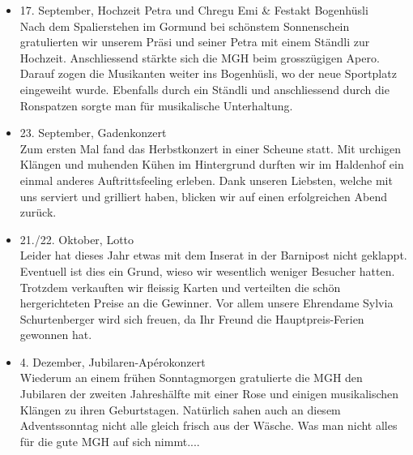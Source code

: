 \begin{history}
\begin{itemize}
        \item[]17. September, Hochzeit Petra und Chregu Emi \& Festakt
        Bogenhüsli\\
        Nach dem Spalierstehen im Gormund bei schönstem Sonnenschein
        gratulierten wir unserem Präsi und seiner Petra mit einem Ständli zur
        Hochzeit. Anschliessend stärkte sich die MGH beim grosszügigen Apero.
        Darauf zogen die Musikanten weiter ins Bogenhüsli, wo der neue
        Sportplatz eingeweiht wurde. Ebenfalls durch ein Ständli und
        anschliessend durch die Ronspatzen sorgte man für musikalische
        Unterhaltung.

        \item[]23. September, Gadenkonzert\\
        Zum ersten Mal fand das Herbstkonzert in einer Scheune statt. Mit
        urchigen Klängen und muhenden Kühen im Hintergrund durften wir im
        Haldenhof ein einmal anderes Auftrittsfeeling erleben. Dank unseren
        Liebsten, welche mit uns serviert und grilliert haben, blicken wir auf
        einen erfolgreichen Abend zurück.

        \item[]21./22. Oktober, Lotto\\
        Leider hat dieses Jahr etwas mit dem Inserat in der Barnipost nicht
        geklappt. Eventuell ist dies ein Grund, wieso wir wesentlich weniger
        Besucher hatten. Trotzdem verkauften wir fleissig Karten und verteilten
        die schön hergerichteten Preise an die Gewinner. Vor allem unsere
        Ehrendame Sylvia Schurtenberger wird sich freuen, da Ihr Freund die
        Hauptpreis-Ferien gewonnen hat.

        \item[]4. Dezember, Jubilaren-Apérokonzert\\
        Wiederum an einem frühen Sonntagmorgen gratulierte die MGH den Jubilaren
        der zweiten Jahreshälfte mit einer Rose und einigen musikalischen
        Klängen zu ihren Geburtstagen. Natürlich sahen auch an diesem
        Adventssonntag nicht alle gleich frisch aus der Wäsche. Was man nicht
        alles für die gute MGH auf sich nimmt....


    \end{itemize}

\end{history}
